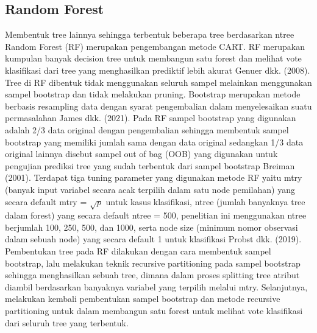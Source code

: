 \subsection{Random Forest}

Membentuk tree lainnya sehingga terbentuk beberapa tree berdasarkan ntree Random Forest (RF) merupakan pengembangan metode CART. RF merupakan kumpulan banyak decision tree untuk membangun satu forest dan melihat vote klasifikasi dari tree yang menghasilkan prediktif lebih akurat Genuer dkk. (2008). Tree di RF dibentuk tidak menggunakan seluruh sampel melainkan menggunakan sampel bootstrap dan tidak melakukan pruning. Bootstrap merupakan metode berbasis resampling data dengan syarat pengembalian dalam menyelesaikan suatu permasalahan James dkk. (2021). Pada RF sampel bootstrap yang digunakan adalah 2/3 data original dengan pengembalian sehingga membentuk sampel bootstrap yang memiliki jumlah sama dengan data original sedangkan 1/3 data original lainnya disebut sampel out of bag (OOB) yang digunakan untuk pengujian prediksi tree yang sudah terbentuk dari sampel bootstrap Breiman (2001).
Terdapat tiga tuning parameter yang digunakan metode RF yaitu mtry (banyak input variabel secara acak terpilih dalam satu node pemilahan) yang secara default mtry = $\sqrt{p}$ untuk kasus klasifikasi, ntree (jumlah banyaknya tree dalam forest) yang secara default ntree = 500, penelitian ini menggunakan ntree berjumlah 100, 250, 500, dan 1000, serta node size (minimum nomor observasi dalam sebuah node) yang secara default 1 untuk klasifikasi Probst dkk. (2019). Pembentukan tree pada RF dilakukan dengan cara membentuk sampel bootstrap, lalu melakukan teknik recursive partitioning pada sampel bootstrap sehingga menghasilkan sebuah tree, dimana dalam proses splitting tree atribut diambil berdasarkan banyaknya variabel yang terpilih melalui mtry. Selanjutnya, melakukan kembali pembentukan sampel bootstrap dan metode recursive partitioning untuk dalam membangun satu forest untuk melihat vote klasifikasi dari seluruh tree yang terbentuk.

